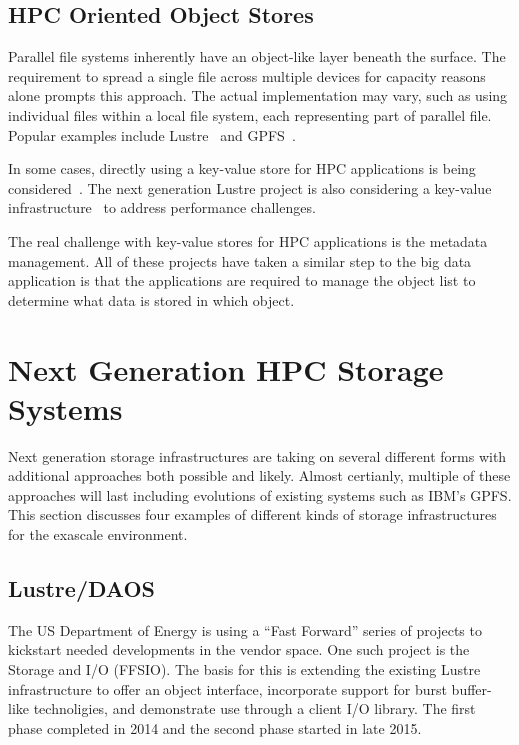 \subsection{HPC Oriented Object Stores}

Parallel file systems inherently have an object-like layer beneath the surface.
The requirement to spread a single file across multiple devices for capacity
reasons alone prompts this approach. The actual implementation may vary, such
as using individual files within a local file system, each representing part
of parallel file. Popular examples include
Lustre~\cite{braam:2002:lustre-arch} and GPFS~\cite{schmuck:2002:gpfs}.

In some cases, directly using a key-value store for HPC applications is being
considered~\cite{yin:2014:key-value-parallel}. The next generation Lustre
project is also considering a key-value infrastructure~\cite{barton:2013:lustre}
to address performance challenges.

The real challenge with key-value stores for HPC applications is the metadata
management. All of these projects have taken a similar step to the big data
application is that the applications are required to manage the object list to
determine what data is stored in which object.

\section{Next Generation HPC Storage Systems}\label{sec:intro}

Next generation storage infrastructures are taking on several different forms
with additional approaches both possible and likely. Almost certianly, multiple
of these approaches will last including evolutions of existing systems such
as IBM's GPFS. This section discusses four examples of different kinds of
storage infrastructures for the exascale environment.

\subsection{Lustre/DAOS}

The US Department of Energy is using a ``Fast Forward'' series of projects to
kickstart needed developments in the vendor space. One such project is the
Storage and I/O (FFSIO). The basis for this is extending the existing Lustre
infrastructure to offer an object interface, incorporate support for burst
buffer-like technoligies, and demonstrate use through a client I/O library. 
The first phase completed in 2014 and the second phase started in late 2015.

